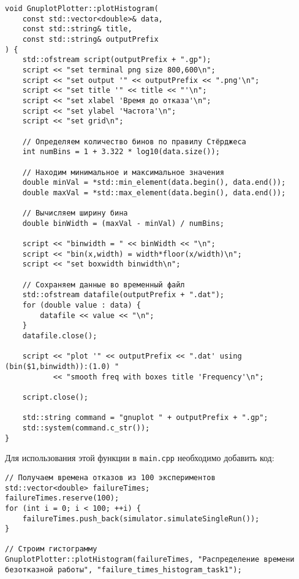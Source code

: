 \begin{verbatim}
void GnuplotPlotter::plotHistogram(
    const std::vector<double>& data,
    const std::string& title,
    const std::string& outputPrefix
) {
    std::ofstream script(outputPrefix + ".gp");
    script << "set terminal png size 800,600\n";
    script << "set output '" << outputPrefix << ".png'\n";
    script << "set title '" << title << "'\n";
    script << "set xlabel 'Время до отказа'\n";
    script << "set ylabel 'Частота'\n";
    script << "set grid\n";
    
    // Определяем количество бинов по правилу Стёрджеса
    int numBins = 1 + 3.322 * log10(data.size());
    
    // Находим минимальное и максимальное значения
    double minVal = *std::min_element(data.begin(), data.end());
    double maxVal = *std::max_element(data.begin(), data.end());
    
    // Вычисляем ширину бина
    double binWidth = (maxVal - minVal) / numBins;
    
    script << "binwidth = " << binWidth << "\n";
    script << "bin(x,width) = width*floor(x/width)\n";
    script << "set boxwidth binwidth\n";
    
    // Сохраняем данные во временный файл
    std::ofstream datafile(outputPrefix + ".dat");
    for (double value : data) {
        datafile << value << "\n";
    }
    datafile.close();
    
    script << "plot '" << outputPrefix << ".dat' using (bin($1,binwidth)):(1.0) "
           << "smooth freq with boxes title 'Frequency'\n";
    
    script.close();
    
    std::string command = "gnuplot " + outputPrefix + ".gp";
    std::system(command.c_str());
}
\end{verbatim}

Для использования этой функции в \texttt{main.cpp} необходимо добавить код:

\begin{verbatim}
// Получаем времена отказов из 100 экспериментов
std::vector<double> failureTimes;
failureTimes.reserve(100);
for (int i = 0; i < 100; ++i) {
    failureTimes.push_back(simulator.simulateSingleRun());
}

// Строим гистограмму
GnuplotPlotter::plotHistogram(failureTimes, "Распределение времени безотказной работы", "failure_times_histogram_task1");
\end{verbatim}

\newpage
